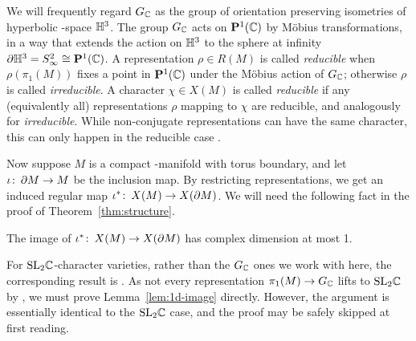 \documentclass[tikz, sepfignums, defaultenums]{nmd/article}
\newcommand{\GC}{G_\C}
\newcommand{\inc}{\iota}
\newcommand{\Pone}{\P^1(\C)}
\begin{document}
We will frequently regard $\GC$ as the group of orientation preserving
isometries of hyperbolic \3-space ${\mathbb{H}}^3$.  The group $\GC$ acts on
$\Pone$ by M\"obius transformations, in a way that extends the action
on ${\mathbb{H}}^3$ to the sphere at infinity
$\partial \H^3 = S^2_\infty \cong \Pone$.  A representation
$\rho \in R(M)$ is called \emph{reducible} when $\rho(\pi_1(M))$ fixes
a point in $\Pone$ under the M\"obius action of $\GC$; otherwise
$\rho$ is called \emph{irreducible}.  A character $\chi \in X(M)$ is
called \emph{reducible} if any (equivalently all) representations
$\rho$ mapping to $\chi$ are reducible, and analogously for
\emph{irreducible}.  While non-conjugate representations can have the
same character, this can only happen in the reducible case
\cite[Lemma~3.15]{HeusenerPorti2004}.

Now suppose $M$ is a compact \3-manifold with torus boundary, and let
$\inc \maps \partial M \to M$ be the inclusion map.  By restricting
representations, we get an induced regular map
$\inc^* \maps X(M) \to X(\partial M)$.  We will need the following
fact in the proof of Theorem~\ref{thm:structure}.

\begin{lemma}\label{lem:1d-image}
  The image of $\inc^* \maps X(M) \to X(\partial M)$ has complex
  dimension at most 1.
\end{lemma}
For $\mathrm{ SL}_{2} {\mathbb C}$-character varieties, rather than the $\GC$ ones we
work with here, the corresponding result is
\cite[Corollary~10.1]{CooperLong1996}.  As not every representation
$\pi_1(M) \to \GC$ lifts to $\mathrm{ SL}_{2} {\mathbb C}$ by
\cite[Theorem~1.4]{HeusenerPorti2004}, we must prove
Lemma~\ref{lem:1d-image} directly.  However, the argument is
essentially identical to the $\mathrm{ SL}_{2} {\mathbb C}$ case, and the proof may
be safely skipped at first reading.
\end{document}
